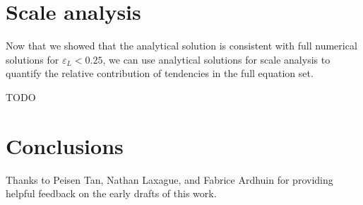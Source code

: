 \documentclass[draft]{agujournal2019}
\begin{document}
\section{Scale analysis}
\label{section:scale_analysis}

Now that we showed that the analytical solution is consistent with full numerical
solutions for $\varepsilon_L < 0.25$, we can use analytical solutions for scale
analysis to quantify the relative contribution of tendencies in the full equation set.

TODO

\section{Conclusions}

\acknowledgments
Thanks to Peisen Tan, Nathan Laxague, and Fabrice Ardhuin for providing helpful
feedback on the early drafts of this work.


\end{document}

